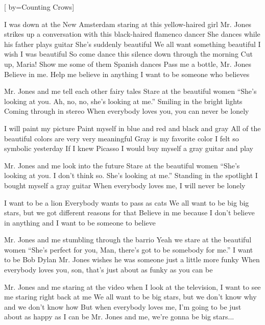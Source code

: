[
	by={Counting Crows}]

\chordson

\beginverse
I was down at the New Amsterdam 
staring at this yellow-haired girl
Mr. Jones strikes up a conversation 
with this black-haired flamenco dancer
She dances while his father plays guitar
She's suddenly beautiful
We all want something beautiful
I wish I was beautiful
So come dance this silence down through the morning
Cut up, Maria! Show me some of them Spanish dances
Pass me a bottle, Mr. Jones
Believe in me. Help me believe in anything
I want to be someone who believes
\endverse

\beginchorus
Mr. Jones and me tell each other fairy tales
Stare at the beautiful women
``She's looking at you. Ah, no, no, she's looking at me.''
Smiling in the bright lights
Coming through in stereo
When everybody loves you, you can never be lonely
\endchorus

\chordsoff
\beginverse
I will paint my picture
Paint myself in blue and red and black and gray
All of the beautiful colors are very very meaningful
Gray is my favorite color
I felt so symbolic yesterday
If I knew Picasso
I would buy myself a gray guitar and play
\endverse

\beginchorus
Mr. Jones and me look into the future
Stare at the beautiful women
``She's looking at you.
I don't think so. She's looking at me.''
Standing in the spotlight
I bought myself a gray guitar
When everybody loves me, I will never be lonely
\endchorus

\beginverse
I want to be a lion
Everybody wants to pass as cats
We all want to be big big stars, but we got different
reasons for that
Believe in me because I don't believe in anything
and I want to be someone to believe
\endverse

\beginchorus
Mr. Jones and me stumbling through the barrio
Yeah we stare at the beautiful women
``She's perfect for you, Man, there's got to be somebody for me.''
I want to be Bob Dylan
Mr. Jones wishes he was someone just a little more funky
When everybody loves you, son, that's just about as
funky as you can be
\endchorus

\beginchorus
Mr. Jones and me staring at the video
when I look at the television, I want to see me staring
right back at me
We all want to be big stars, but we don't know why
and we don't know how
But when everybody loves me, I'm going to be just
about as happy as I can be
Mr. Jones and me, we're gonna be big stars...
\endchorus


\endsong

